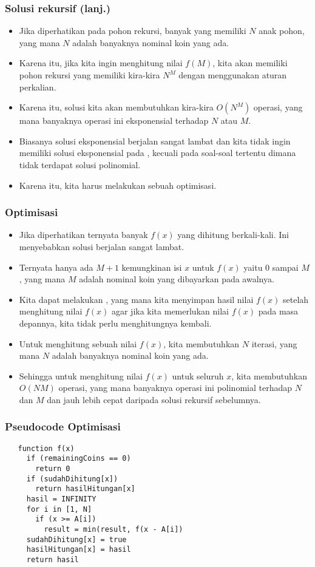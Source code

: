 \begin{frame}
\frametitle{Solusi rekursif (lanj.)}
\begin{itemize}
  \item Jika diperhatikan pada pohon rekursi, banyak  yang memiliki $N$ anak pohon, yang mana $N$ adalah banyaknya nominal koin yang ada.
  \item Karena itu, jika kita ingin menghitung nilai $f(M)$, kita akan memiliki pohon rekursi yang memiliki kira-kira $N^M$  dengan menggunakan aturan perkalian.
  \item Karena itu, solusi kita akan membutuhkan kira-kira $O(N^M)$ operasi, yang mana banyaknya operasi ini eksponensial terhadap $N$ atau $M$.
  \item Biasanya solusi eksponensial berjalan sangat lambat dan kita tidak ingin memiliki solusi eksponensial pada , kecuali pada soal-soal tertentu dimana tidak terdapat solusi polinomial. 
  \item Karena itu, kita harus melakukan sebuah optimisasi.
\end{itemize}
\end{frame}

\begin{frame}
\frametitle{Optimisasi}
\begin{itemize}
  \item Jika diperhatikan ternyata banyak $f(x)$ yang dihitung berkali-kali. Ini menyebabkan solusi berjalan sangat lambat.
  \item Ternyata hanya ada $M + 1$ kemungkinan isi $x$ untuk $f(x)$ yaitu $0$ sampai $M$, yang mana $M$ adalah nominal koin yang dibayarkan pada awalnya.
  \item Kita dapat melakukan , yang mana kita menyimpan hasil nilai $f(x)$ setelah menghitung nilai $f(x)$ agar jika kita memerlukan nilai $f(x)$ pada masa depannya, kita tidak perlu menghitungnya kembali.
  \item Untuk menghitung sebuah nilai $f(x)$, kita membutuhkan $N$ iterasi, yang mana $N$ adalah banyaknya nominal koin yang ada.
  \item Sehingga untuk menghitung nilai $f(x)$ untuk seluruh $x$, kita membutuhkan $O(NM)$ operasi, yang mana banyaknya operasi ini polinomial terhadap $N$ dan $M$ dan jauh lebih cepat daripada solusi rekursif sebelumnya.
\end{itemize}
\end{frame}

\begin{frame} [fragile]
\frametitle{Pseudocode Optimisasi}
\begin{lstlisting}
   function f(x)
     if (remainingCoins == 0)
       return 0
     if (sudahDihitung[x])
       return hasilHitungan[x]
     hasil = INFINITY
     for i in [1, N]
       if (x >= A[i])
         result = min(result, f(x - A[i])
     sudahDihitung[x] = true
     hasilHitungan[x] = hasil
     return hasil
\end{lstlisting}
\end{frame}

